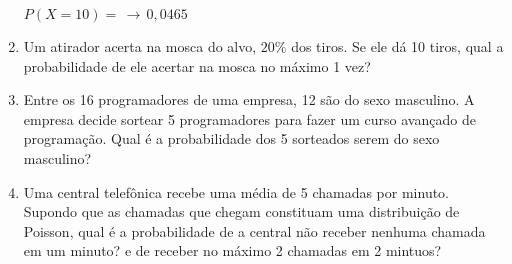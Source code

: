 \begin{enumerate}
{        $P(X=10) = \, \to\, 0,0465$
	}
\item Um atirador acerta na mosca do alvo, $20\%$ dos tiros. Se ele dá 10 tiros, qual a probabilidade de ele acertar na mosca no máximo 1 vez?

	
\item Entre os 16 programadores de uma empresa, 12 são do sexo masculino. A empresa decide sortear 5 programadores para fazer um curso avançado de programação. Qual é a probabilidade dos 5 sorteados serem do sexo masculino?


\item Uma central telefônica recebe uma média de 5 chamadas por minuto. Supondo que as chamadas que chegam constituam uma distribuição de Poisson, qual é a probabilidade de a central não receber nenhuma chamada em um minuto? e de receber no máximo 2 chamadas em 2 mintuos?



\end{enumerate}
